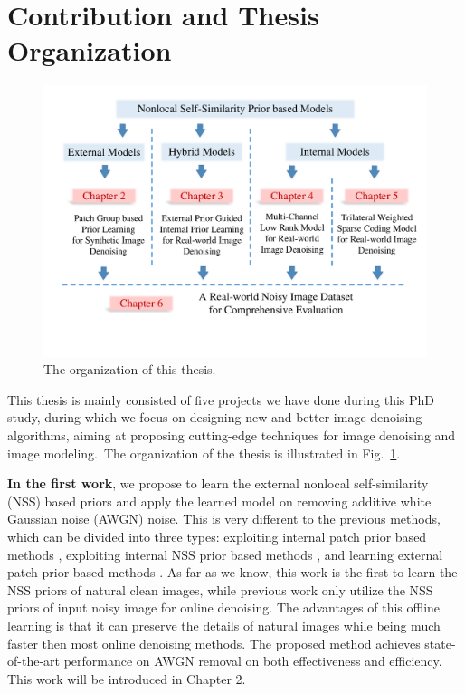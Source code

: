 \section{Contribution and Thesis Organization}
\label{sec:intro:new}

\begin{figure}[t!]
\centering
\includegraphics[width=1\linewidth]{images/ThesisOrganization.pdf}
\vspace{-20mm}
\caption{The organization of this thesis.}
\label{fig1-1}
\end{figure}

This thesis is mainly consisted of five projects we have done during this PhD study, during which we focus on designing new and better image denoising algorithms, aiming at proposing cutting-edge techniques for image denoising and image modeling.\ The organization of the thesis is illustrated in Fig.\ \ref{fig1-1}.

\textbf{In the first work}, we propose to learn the external nonlocal self-similarity (NSS) based priors and apply the learned model on removing additive white Gaussian noise (AWGN) noise. This is very different to the previous methods, which can be divided into three types: exploiting internal patch prior based methods \cite{ksvd,ple}, exploiting internal NSS prior based methods \cite{bm3d,lssc,ncsr,wnnm}, and learning external patch prior based methods \cite{epll}. As far as we know, this work is the first to learn the NSS priors of natural clean images, while previous work only utilize the NSS priors of input noisy image for online denoising. The advantages of this offline learning is that it can preserve the details of natural images while being much faster then most online denoising methods. The proposed method achieves state-of-the-art performance on AWGN removal on both effectiveness and efficiency. This work will be introduced in Chapter 2.

